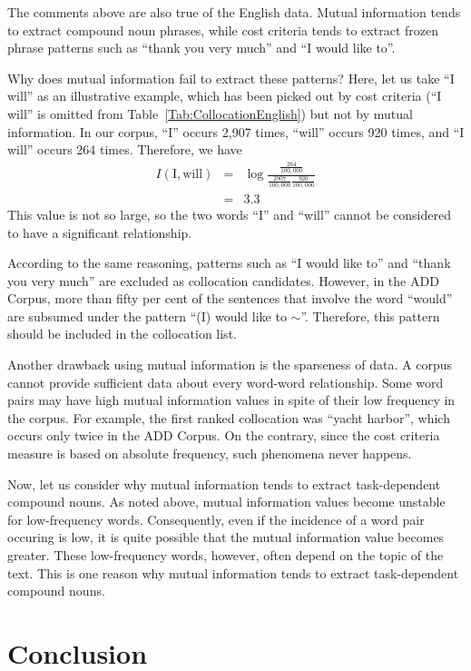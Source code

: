 The comments above are also true of the English data.
Mutual information tends to extract compound noun phrases,
while cost criteria tends to extract frozen phrase patterns
such as ``thank you very much'' and ``I would like to''.

Why does mutual information fail to extract these patterns?
Here, let us take ``I will'' as an illustrative example,
which has been picked out by cost criteria
(``I will'' is omitted from Table~\ref{Tab:CollocationEnglish})
but not by mutual information.
In our corpus,
``I'' occurs 2,907 times, ``will'' occurs 920 times,
and ``I  will'' occurs 264 times.
Therefore, we have
\begin{eqnarray}
  I(\mbox{I},\mbox{will}) & = & \log \frac{\frac{264}{100,000}}{\frac{2907}{100,000} \frac{920}{100,000}} \nonumber \\
        & = & 3.3
\end{eqnarray}
This value is not so large,
so the two words ``I'' and ``will'' cannot be considered to
have a significant relationship.

According to the same reasoning,
patterns such as ``I would like to'' and ``thank you very much''
are excluded as collocation candidates.
However, in the ADD Corpus,
more than fifty per cent of the sentences that involve the word ``would''
are subsumed under the pattern ``(I) would like to $\sim$''.
Therefore, this pattern should be included in the collocation list.

Another drawback using mutual information is the sparseness of data.
A corpus cannot provide sufficient data about every word-word relationship.
Some word pairs may have high mutual information values
in spite of their low frequency in the corpus.
For example,
the first ranked collocation was ``yacht harbor'',
which occurs only twice in the ADD Corpus.
On the contrary, since the cost criteria measure is based on absolute frequency,
such phenomena never happens.

Now, let us consider why mutual information
tends to extract task-dependent compound nouns.
As noted above, mutual information values become unstable
for low-frequency words.
Consequently, even if the incidence of a word pair occuring is low,
it is quite possible that the mutual information value becomes greater.
These low-frequency words, however, often depend on the topic of the text.
This is one reason
why mutual information tends to extract task-dependent compound nouns.


\section{Conclusion}

